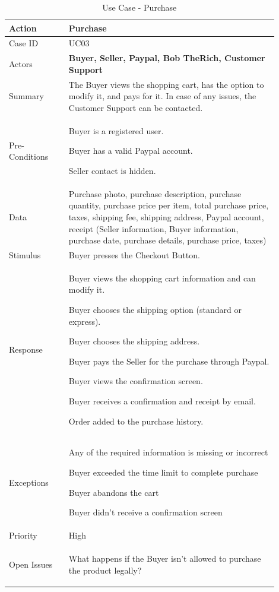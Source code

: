 \documentclass[11pt]{article}
\newcounter{use case ID}
\newcommand\tabularhead[1]{
    \begin{table}[ht]
        \addtocounter{use case ID}{1}
        \caption{Use Case \arabic{use case ID} - #1}
        \vspace{0.2cm}
        \begin{tabular}{|p{0.2\linewidth}|p{0.70\linewidth}|}
            \hline
            \textbf{Action} & \textbf{#1} \\
            \hline}
\newcommand\addrow[2]{#1 & #2\\ \hline}
\newcommand\addmulrow[2]{ \begin{minipage}[t][][t]{2.5cm}#1\end{minipage}
                &\begin{minipage}[t][][t]{11cm}
                    \begin{enumerate}[itemsep=-1ex] #2   \end{enumerate}
                \end{minipage}\vfill\\ \hline}
\newenvironment{usecase}{\tabularhead}
        {\hline\end{tabular}\end{table}}
\newcounter{req ID}
\begin{document}
\begin{usecase}{Purchase}
    \addrow{Case ID}{UC03}
    \addrow{Actors}{\textbf{Buyer, Seller, Paypal, Bob TheRich, Customer Support}}
    \addrow{Summary}{The Buyer views the shopping cart, has the option to modify it, and pays for it. In case of any issues, the Customer Support can be contacted.}
    \addrow{Pre-Conditions}{
        \begin{itemize}{
            \item Buyer is a registered user.
            \item Buyer has a valid Paypal account. 
            \item Seller contact is hidden.
        }\end{itemize}}
    \addrow{Data}{Purchase photo, purchase description, purchase quantity, purchase price per item, total purchase price, taxes, shipping fee, shipping address, Paypal account, receipt (Seller information, Buyer information, purchase date, purchase details, purchase price, taxes)}
    \addrow{Stimulus}{Buyer presses the Checkout Button.}
    \addmulrow{Response}{
        \begin{itemize}{
            \item Buyer views the shopping cart information and can modify it.
            \item Buyer chooses the shipping option (standard or express).
            \item Buyer chooses the shipping address.
            \item Buyer pays the Seller for the purchase through Paypal.
            \item Buyer views the confirmation screen.  
            \item Buyer receives a confirmation and receipt by email.
            \item Order added to the purchase history.}
            \end{itemize}}
    \addmulrow{Exceptions}{
        \begin{enumerate}{
        \item Any of the required information is missing or incorrect
        \item Buyer exceeded the time limit to complete purchase
        \item Buyer abandons the cart
        \item Buyer didn’t receive a confirmation screen} \end{enumerate}}
    \addrow{Priority}{High}
    \addmulrow{Open Issues}{
        \begin{enumerate}{
            \item What happens if the Buyer isn’t allowed to purchase the product legally?} 
        \end{enumerate}}
\end{usecase}
\end{document}
